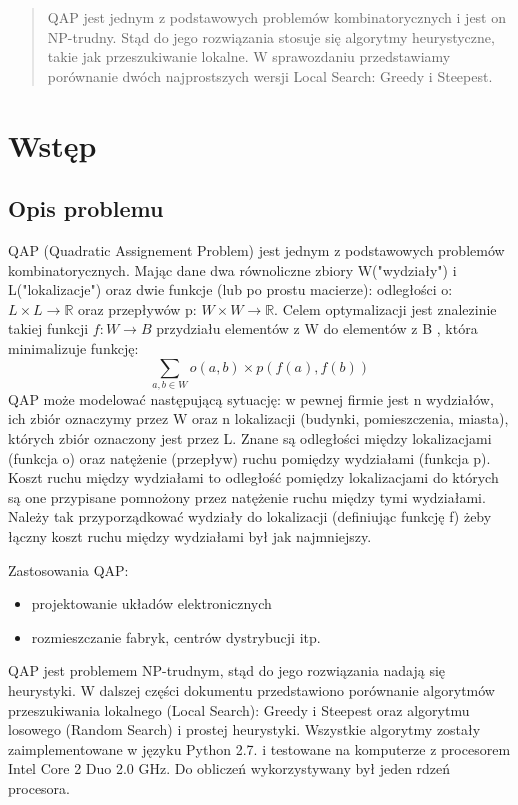 \documentclass{article}
\begin{document}


\begin{abstract}
QAP jest jednym z podstawowych problemów kombinatorycznych i jest on NP-trudny. Stąd do jego rozwiązania stosuje się algorytmy heurystyczne, takie jak przeszukiwanie lokalne. W sprawozdaniu przedstawiamy porównanie dwóch najprostszych wersji Local Search: Greedy i Steepest.
\end{abstract}


\section{Wstęp}
	\subsection{Opis problemu}
	QAP (Quadratic Assignement Problem) jest jednym z podstawowych problemów kombinatorycznych. Mając dane dwa równoliczne zbiory W("wydziały") i L("lokalizacje") oraz dwie funkcje (lub po prostu macierze): odległości o: $ L \times L \rightarrow \mathbb{R} $ oraz przepływów p: $ W \times W \rightarrow \mathbb{R} $. Celem optymalizacji jest znalezinie takiej funkcji $ f: W \rightarrow B $  przydziału elementów z W do elementów z B , która minimalizuje funkcję:
	$$\sum_{a,b \in W}o(a,b)\times p(f(a),f(b))$$
	QAP może modelować następującą sytuację: w pewnej firmie jest n wydziałów, ich zbiór oznaczymy przez W oraz n lokalizacji (budynki, pomieszczenia, miasta), których zbiór oznaczony jest przez L. Znane są odległości między lokalizacjami (funkcja o) oraz natężenie (przepływ) ruchu pomiędzy wydziałami (funkcja p). Koszt ruchu między wydziałami to odległość pomiędzy lokalizacjami do których są one przypisane pomnożony przez natężenie ruchu między tymi wydziałami. Należy tak przyporządkować wydziały do lokalizacji (definiując funkcję f) żeby łączny koszt ruchu między wydziałami był jak najmniejszy.

	Zastosowania QAP:
	\begin{itemize}
		\item{projektowanie układów elektronicznych}
		\item{rozmieszczanie fabryk, centrów dystrybucji itp.}
	\end{itemize}
	
	QAP jest problemem NP-trudnym, stąd do jego rozwiązania nadają się heurystyki. W dalszej części dokumentu przedstawiono porównanie algorytmów przeszukiwania lokalnego (Local Search): Greedy i Steepest oraz algorytmu losowego (Random Search) i prostej heurystyki. Wszystkie algorytmy zostały zaimplementowane w języku Python 2.7. i testowane na komputerze z procesorem Intel Core 2 Duo 2.0 GHz. Do obliczeń wykorzystywany był jeden rdzeń procesora.
\end{document}
